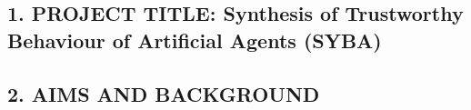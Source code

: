 \documentclass[a4paper,12pt]{scrartcl}
\def\TITLE{Synthesis of Trustworthy Behaviour of Artificial Agents (SYBA)}
\begin{document}

\subsection*{1. PROJECT TITLE: \TITLE}
% 
% 
 \vspace{-0.2cm}

\subsection*{2. AIMS AND BACKGROUND}
 \vspace{-0.3cm}






\end{document}

